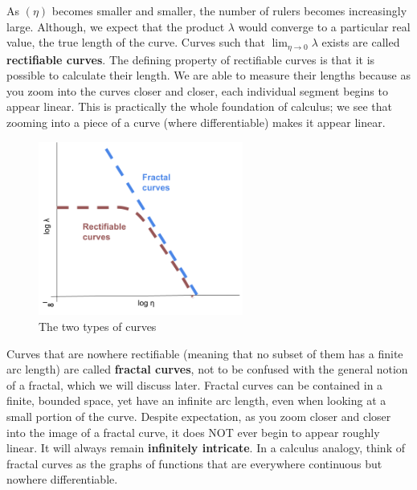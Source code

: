 As $(\eta)$ becomes smaller and smaller, the number of rulers becomes increasingly large. Although, we expect that the product $\lambda$ would converge to a particular real value, the true length of the curve. Curves such that $\displaystyle \lim_{\eta\to0}\lambda$ exists are called \textbf{rectifiable curves}. The defining property of rectifiable curves is that it is possible to calculate their length. We are able to measure their lengths because as you zoom into the curves closer and closer, each individual segment begins to appear linear. This is practically the whole foundation of calculus; we see that zooming into a piece of a curve (where differentiable) makes it appear linear. \par

\begin{figure}
  \begin{center}
    \includegraphics[width=0.6\textwidth]{Images/1.1.2.png}
  \end{center}
  \caption{The two types of curves}
\end{figure}

Curves that are nowhere rectifiable (meaning that no subset of them has a finite arc length) are called \textbf{fractal curves}, not to be confused with the general notion of a fractal, which we will discuss later. Fractal curves can be contained in a finite, bounded space, yet have an infinite arc length, even when looking at a small portion of the curve. Despite expectation, as you zoom closer and closer into the image of a fractal curve, it does NOT ever begin to appear roughly linear. It will always remain \textbf{infinitely intricate}. In a calculus analogy, think of fractal curves as the graphs of functions that are everywhere continuous but nowhere differentiable. \par

